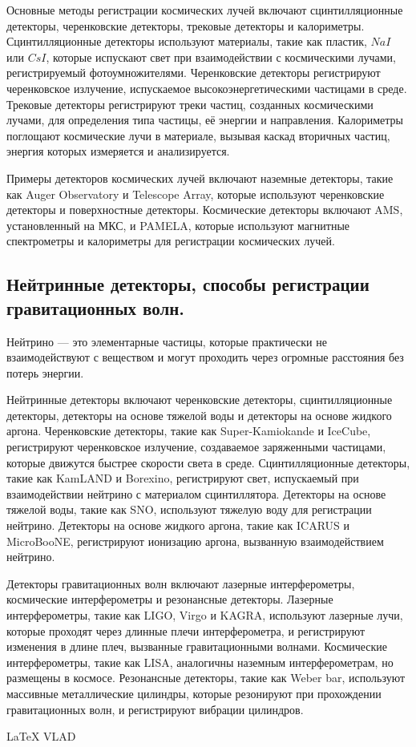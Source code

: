 \documentclass[12pt]{article}
\begin{document}
Основные методы регистрации космических лучей включают сцинтилляционные детекторы, черенковские детекторы, трековые детекторы и калориметры. Сцинтилляционные детекторы используют материалы, такие как пластик, $NaI$ или $CsI$, которые испускают свет при взаимодействии с космическими лучами, регистрируемый фотоумножителями. Черенковские детекторы регистрируют черенковское излучение, испускаемое высокоэнергетическими частицами в среде. Трековые детекторы регистрируют треки частиц, созданных космическими лучами, для определения типа частицы, её энергии и направления. Калориметры поглощают космические лучи в материале, вызывая каскад вторичных частиц, энергия которых измеряется и анализируется.

Примеры детекторов космических лучей включают наземные детекторы, такие как Auger Observatory и Telescope Array, которые используют черенковские детекторы и поверхностные детекторы. Космические детекторы включают AMS, установленный на МКС, и PAMELA, которые используют магнитные спектрометры и калориметры для регистрации космических лучей.

\subsection{Нейтринные детекторы, способы регистрации гравитационных волн.}
Нейтрино — это элементарные частицы, которые практически не взаимодействуют с веществом и могут проходить через огромные расстояния без потерь энергии. 

Нейтринные детекторы включают черенковские детекторы, сцинтилляционные детекторы, детекторы на основе тяжелой воды и детекторы на основе жидкого аргона. Черенковские детекторы, такие как Super-Kamiokande и IceCube, регистрируют черенковское излучение, создаваемое заряженными частицами, которые движутся быстрее скорости света в среде. Сцинтилляционные детекторы, такие как KamLAND и Borexino, регистрируют свет, испускаемый при взаимодействии нейтрино с материалом сцинтиллятора. Детекторы на основе тяжелой воды, такие как SNO, используют тяжелую воду для регистрации нейтрино. Детекторы на основе жидкого аргона, такие как ICARUS и MicroBooNE, регистрируют ионизацию аргона, вызванную взаимодействием нейтрино.

Детекторы гравитационных волн включают лазерные интерферометры, космические интерферометры и резонансные детекторы. Лазерные интерферометры, такие как LIGO, Virgo и KAGRA, используют лазерные лучи, которые проходят через длинные плечи интерферометра, и регистрируют изменения в длине плеч, вызванные гравитационными волнами. Космические интерферометры, такие как LISA, аналогичны наземным интерферометрам, но размещены в космосе. Резонансные детекторы, такие как Weber bar, используют массивные металлические цилиндры, которые резонируют при прохождении гравитационных волн, и регистрируют вибрации цилиндров.

\begin{center}
	\LaTeX  
	VLAD
\end{center}
\end{document}
